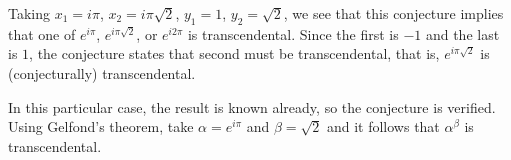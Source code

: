 \documentclass[12pt]{article}
\begin{document}
Taking $x_1=i\pi$, $x_2=i\pi\sqrt{2}$, $y_1=1$, $y_2=\sqrt{2}$, we see that this conjecture implies that one of $e^{i\pi}$, $e^{i\pi\sqrt{2}}$, or $e^{i2\pi}$ is transcendental.  Since the first is $-1$ and the last is $1$, the conjecture states that second must be transcendental, that is, $e^{i\pi\sqrt{2}}$ is (conjecturally) transcendental.

In this particular case, the result is known already, so the conjecture is verified.  Using Gelfond's theorem, take $\alpha=e^{i\pi}$ and $\beta=\sqrt{2}$ and it follows that $\alpha^\beta$ is transcendental.
\end{document}

